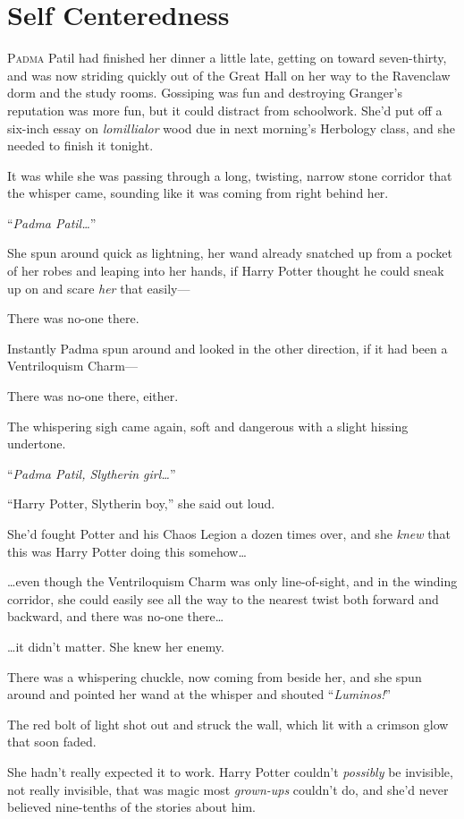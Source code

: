 \chapter{Self Centeredness}

\lettrine{P}{adma} Patil had finished her dinner a little late, getting on toward seven-thirty, and was now striding quickly out of the Great Hall on her way to the Ravenclaw dorm and the study rooms. Gossiping was fun and destroying Granger’s reputation was more fun, but it could distract from schoolwork. She’d put off a six-inch essay on \emph{lomillialor} wood due in next morning’s Herbology class, and she needed to finish it tonight.

It was while she was passing through a long, twisting, narrow stone corridor that the whisper came, sounding like it was coming from right behind her.

“\emph{Padma Patil…}”

She spun around quick as lightning, her wand already snatched up from a pocket of her robes and leaping into her hands, if Harry Potter thought he could sneak up on and scare \emph{her} that easily—

There was no-one there.

Instantly Padma spun around and looked in the other direction, if it had been a Ventriloquism Charm—

There was no-one there, either.

The whispering sigh came again, soft and dangerous with a slight hissing undertone.

“\emph{Padma Patil, Slytherin girl…}”

“Harry Potter, Slytherin boy,” she said out loud.

She’d fought Potter and his Chaos Legion a dozen times over, and she \emph{knew} that this was Harry Potter doing this somehow…

…even though the Ventriloquism Charm was only line-of-sight, and in the winding corridor, she could easily see all the way to the nearest twist both forward and backward, and there was no-one there…

…it didn’t matter. She knew her enemy.

There was a whispering chuckle, now coming from beside her, and she spun around and pointed her wand at the whisper and shouted “\emph{Luminos!}”

The red bolt of light shot out and struck the wall, which lit with a crimson glow that soon faded.

She hadn’t really expected it to work. Harry Potter couldn’t \emph{possibly} be invisible, not really invisible, that was magic most \emph{grown-ups} couldn’t do, and she’d never believed nine-tenths of the stories about him.

